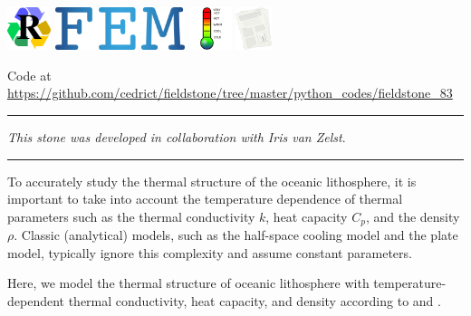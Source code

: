\includegraphics[height=1.25cm]{images/pictograms/replication}
\includegraphics[height=1.25cm]{images/pictograms/FEM}
\includegraphics[height=1.25cm]{images/pictograms/temperature}
\includegraphics[height=1.25cm]{images/pictograms/publication}




\begin{center}
Code at \url{https://github.com/cedrict/fieldstone/tree/master/python_codes/fieldstone_83}
\end{center}

\par\noindent\rule{\textwidth}{0.4pt}

{\sl This stone was developed in collaboration with Iris van Zelst}. 

\par\noindent\rule{\textwidth}{0.4pt}


To accurately study the thermal structure of the oceanic lithosphere, it is important to take 
into account the temperature dependence of thermal parameters such as the thermal conductivity $k$, 
heat capacity $C_p$, and the density $\rho$. Classic (analytical) models, such as the half-space 
cooling model and the plate model, typically ignore this complexity and assume constant parameters.
 
Here, we model the thermal structure of oceanic lithosphere with temperature-dependent 
thermal conductivity, heat capacity, and density according to \textcite{mcjp05} 
and \textcite{rihc18}. 

